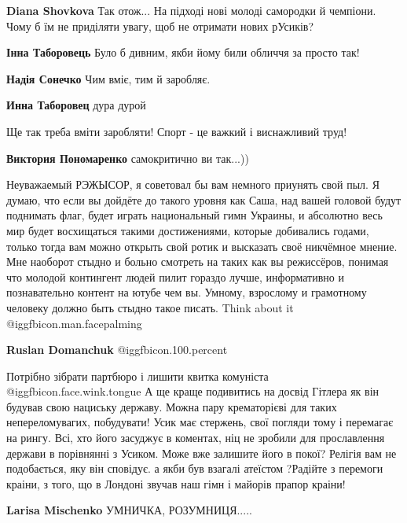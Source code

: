\begin{itemize}
\begin{itemize}
\textbf{Diana Shovkova} Так отож... На підході нові молоді самородки й чемпіони. Чому б їм не приділяти увагу, щоб не отримати нових рУсиків?

\textbf{Інна Таборовець} Було б дивним, якби йому били обличчя за просто так!

\textbf{Надія Сонечко} Чим вміє, тим й заробляє.

\textbf{Инна Таборовец} дура дурой

Ще так треба вміти заробляти! Спорт - це важкий і виснажливий труд!

\textbf{Виктория Пономаренко} самокритично ви так...))
\end{itemize} %


Неуважаемый РЭЖЫСОР, я советовал бы вам немного приунять свой пыл. Я думаю, что
если вы дойдёте до такого уровня как Саша, над вашей головой будут поднимать
флаг, будет играть национальный гимн Украины, и абсолютно весь мир будет
восхищаться такими достижениями, которые добивались годами, только тогда вам
можно открыть свой ротик и высказать своё никчёмное мнение. Мне наоборот стыдно
и больно смотреть на таких как вы режиссёров, понимая что молодой контингент
людей пилит гораздо лучше, информативно и познавательно контент на ютубе чем
вы. Умному, взрослому и грамотному человеку должно быть стыдно такое писать.
Think about it @igg{fbicon.man.facepalming} 

\begin{itemize} %
\textbf{Ruslan Domanchuk}  @igg{fbicon.100.percent} 
\end{itemize} %


Потрібно зібрати партбюро і лишити квитка комуніста @igg{fbicon.face.wink.tongue} А ще краще подивитись на
досвід Гітлера як він будував свою нациську державу. Можна пару крематорієві для
таких непереломувагих, побудувати! Усик має стержень, свої погляди тому і
перемагає на рингу. Всі, хто його засуджує в коментах, ніц не зробили для
прославлення держави в порівнянні з Усиком. Може вже залишите його в
покої? Релігія вам не подобається, яку він сповідує. а якби був взагалі атеїстом
?Радійте з перемоги краіни, з того, що в Лондоні звучав наш гімн і майорів прапор
краіни!

\begin{itemize} %
\textbf{Larisa Mischenko} УМНИЧКА, РОЗУМНИЦЯ.....
\end{itemize} %


\end{itemize}
